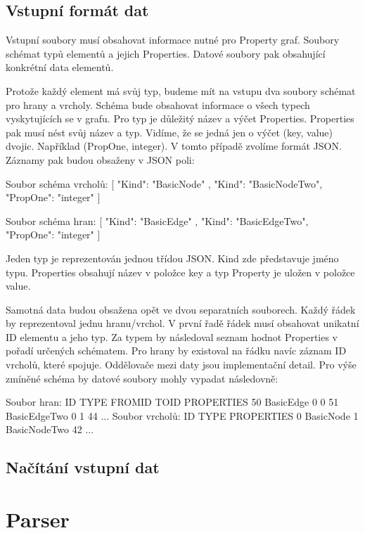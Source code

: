 \subsection{Vstupní formát dat}

Vstupní soubory musí obsahovat informace nutné pro Property graf.
Soubory schémat typů elementů a jejich Properties.
Datové soubory pak obsahující konkrétní data elementů.

Protože každý element má svůj typ, budeme mít na vstupu dva soubory schémat pro hrany a vrcholy.
Schéma bude obsahovat informace o všech typech vyskytujících se v grafu.
Pro typ je důležitý název a výčet Properties.
Properties pak musí nést svůj název a typ.
Vidíme, že se jedná jen o výčet (key, value) dvojic. Například (PropOne, integer).
V tomto případě zvolíme formát JSON.
Záznamy pak budou obsaženy v JSON poli:
\begin{code}
Soubor schéma vrcholů:
[    { "Kind": "BasicNode" }, 
{ "Kind": "BasicNodeTwo", "PropOne": "integer" } ]

Soubor schéma hran:
[    { "Kind": "BasicEdge" }, 
{ "Kind": "BasicEdgeTwo", "PropOne": "integer" } ]
\end{code}
Jeden typ je reprezentován jednou třídou JSON.
Kind zde představuje jméno typu. 
Properties obsahují název v položce key a typ Property je uložen v položce value.

Samotná data budou obsažena opět ve dvou separatních souborech.
Každý řádek by reprezentoval jednu hranu/vrchol.
V první řadě řádek musí obsahovat unikatní ID elementu a jeho typ. 
Za typem by následoval seznam hodnot Properties v pořadí určených schématem.
Pro hrany by existoval na řádku navíc záznam ID vrcholů, které spojuje.
Oddělovače mezi daty jsou implementační detail.
Pro výše zmíněné schéma by datové soubory mohly vypadat následovně:
\begin{code}
Soubor hran:
ID TYPE FROMID TOID PROPERTIES
50 BasicEdge 0 0 
51 BasicEdgeTwo 0 1 44
...
Soubor vrcholů:
ID TYPE PROPERTIES
0 BasicNode
1 BasicNodeTwo 42
...
\end{code}

\subsection{Načítání vstupní dat}




\section{Parser}

